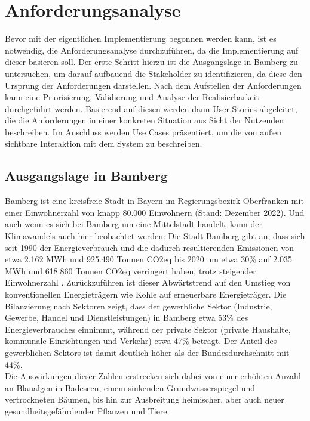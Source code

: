 \chapter{Anforderungsanalyse}
\label{sec:requirements}
Bevor mit der eigentlichen Implementierung begonnen werden kann, ist es notwendig, die Anforderungsanalyse durchzuführen, da die Implementierung auf dieser basieren soll. Der erste Schritt hierzu ist die Ausgangslage in Bamberg zu untersuchen, um darauf aufbauend die Stakeholder zu identifizieren, da diese den Ursprung der Anforderungen darstellen. Nach dem Aufstellen der Anforderungen kann eine Priorisierung, Validierung und Analyse der Realisierbarkeit durchgeführt werden. Basierend auf diesen werden dann User Stories abgeleitet, die die Anforderungen in einer konkreten Situation aus Sicht der Nutzenden beschreiben. Im Anschluss werden Use Cases präsentiert, um die von außen sichtbare Interaktion mit dem System zu beschreiben.

\section{Ausgangslage in Bamberg}
\label{sec:ausgangslage}
Bamberg ist eine kreisfreie Stadt in Bayern im Regierungsbezirk Oberfranken mit einer Einwohnerzahl von knapp 80.000 Einwohnern (Stand: Dezember 2022). Und auch wenn es sich bei Bamberg um eine Mittelstadt handelt, kann der Klimawandels auch hier beobachtet werden: Die Stadt Bamberg gibt an, dass sich seit 1990 der Energieverbrauch und die dadurch resultierenden Emissionen von etwa 2.162 MWh und 925.490 Tonnen CO2eq bis 2020 um etwa 30\% auf 2.035 MWh und 618.860 Tonnen CO2eq verringert haben, trotz steigender Einwohnerzahl \cite{Wehner2016}. Zurückzuführen ist dieser Abwärtstrend auf den Umstieg von konventionellen Energieträgern wie Kohle auf erneuerbare Energieträger. Die Bilanzierung nach Sektoren zeigt, dass der gewerbliche Sektor (Industrie, Gewerbe, Handel und Dienstleistungen) in Bamberg etwa 53\% des Energieverbrauches einnimmt, während der private Sektor (private Haushalte, kommunale Einrichtungen und Verkehr) etwa 47\% beträgt. Der Anteil des gewerblichen Sektors ist damit deutlich höher als der Bundesdurchschnitt mit 44\%. \\ Die Auswirkungen dieser Zahlen erstrecken sich dabei von einer erhöhten Anzahl an Blaualgen in Badeseen, einem sinkenden Grundwasserspiegel und vertrockneten Bäumen, bis hin zur Ausbreitung heimischer, aber auch neuer gesundheitsgefährdender Pflanzen und Tiere. 

